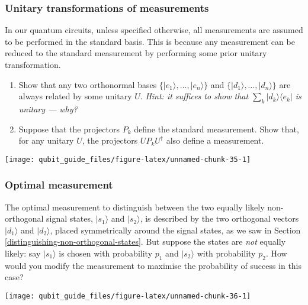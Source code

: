 \documentclass[fleqn]{article}
\begin{document}
\hypertarget{unitary-transformations-of-measurements}{%
\subsubsection{Unitary transformations of measurements}\label{unitary-transformations-of-measurements}}

In our quantum circuits, unless specified otherwise, all measurements are assumed to be performed in the standard basis.
This is because any measurement can be reduced to the standard measurement by performing some prior unitary transformation.

\begin{enumerate}
\def\labelenumi{\arabic{enumi}.}
\item
  Show that any two orthonormal bases \(\{|e_1\rangle,\ldots,|e_n\rangle\}\) and \(\{|d_1\rangle,\ldots,|d_n\rangle\}\) are always related by some unitary \(U\).
  \emph{Hint: it suffices to show that \(\sum_k |d_k\rangle\langle e_k|\) is unitary --- why?}
\item
  Suppose that the projectors \(P_k\) define the standard measurement.
  Show that, for any unitary \(U\), the projectors \(UP_kU^\dagger\) also define a measurement.
\end{enumerate}

\begin{center}\texttt{[image: qubit\_guide\_files/figure-latex/unnamed-chunk-35-1]} \end{center}

\hypertarget{optimal-measurement}{%
\subsubsection{Optimal measurement}\label{optimal-measurement}}

The optimal measurement to distinguish between the two equally likely non-orthogonal signal states, \(|s_1\rangle\) and \(|s_2\rangle\), is described by the two orthogonal vectors \(|d_1\rangle\) and \(|d_2\rangle\), placed symmetrically around the signal states, as we saw in Section \ref{distinguishing-non-orthogonal-states}.
But suppose the states are \emph{not} equally likely: say \(|s_1\rangle\) is chosen with probability \(p_1\) and \(|s_2\rangle\) with probability \(p_2\).
How would you modify the measurement to maximise the probability of success in this case?

\begin{center}\texttt{[image: qubit\_guide\_files/figure-latex/unnamed-chunk-36-1]} \end{center}
\end{document}
